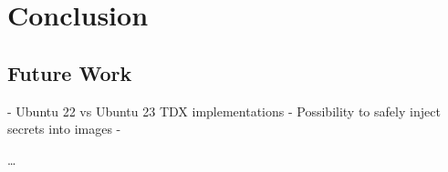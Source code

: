 
\chapter{Conclusion}
\label{ch:Conclusion}

\section{Future Work}
- Ubuntu 22 vs Ubuntu 23 TDX implementations
- Possibility to safely inject secrets into images
- 

\dots
